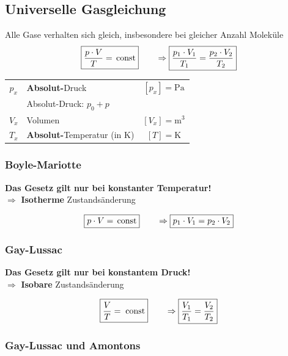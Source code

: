 \vfill\null
\columnbreak

\subsection{Universelle Gasgleichung}
Alle Gase verhalten sich gleich, insbesondere bei gleicher Anzahl Moleküle \\


$$ \boxed{ \frac{p \cdot V}{T} = \, \mathrm{const} } \qquad  \Rightarrow \boxed{ \frac{p_1 \cdot V_1}{T_1} = \frac{p_2 \cdot V_2}{T_2} } $$ 


\begin{tabular}{c l c}
	$p_x$ & \textbf{Absolut-}Druck & $[p_x] = \mathrm{Pa}$ \\
	& Absolut-Druck: $p_0 + p$ \\
	$V_x$ & Volumen & $[V_x] = \mathrm{m^3}$ \\
	$T_x$ & \textbf{Absolut-}Temperatur (in K) & $[T] = \mathrm{K}$ \\
\end{tabular}
	

	
\subsubsection{Boyle-Mariotte}	
\textbf{Das Gesetz gilt nur bei konstanter Temperatur!} \\
$\Rightarrow$ \textbf{Isotherme} Zustandsänderung

$$  \boxed{ p \cdot V = \, \mathrm{const} } \qquad  \Rightarrow  \boxed{ p_1 \cdot V_1 = p_2 \cdot V_2 } $$ 





\subsubsection{Gay-Lussac}

\textbf{ Das Gesetz gilt nur bei konstantem Druck!} \\
$\Rightarrow$ \textbf{Isobare} Zustandsänderung

$$  \boxed{ \frac{V}{T} = \; \mathrm{const} } \qquad  \Rightarrow  \boxed{ \frac{V_1}{T_1} = \frac{V_2}{T_2} } $$


	
	
\subsubsection{Gay-Lussac und Amontons}


